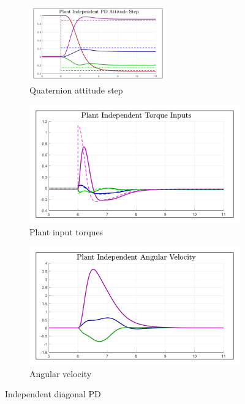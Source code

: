 \begin{figure}[htbp]
\centering
\begin{subfigure}{\textwidth}
\centering
\includegraphics[width=0.65\textwidth]{graphs/PD_Diagonal_Independent_Step}
\caption{Quaternion attitude step}
\label{fig:PD_Diagonal_Independent_Step}
\end{subfigure}
\begin{subfigure}{0.49\textwidth}
\centering
\includegraphics[width=\textwidth]{graphs/PD_Diagonal_Independent_Torque}
\caption{Plant input torques}
\label{fig:PD_Diagonal_Independent_Torque}
\end{subfigure}
\begin{subfigure}{0.49\textwidth}
\centering
\includegraphics[width=\textwidth]{graphs/PD_Diagonal_Independent_Angular}
\caption{Angular velocity}
\label{fig:PD_Diagonal_Independent_Angular}
\end{subfigure}
\caption{Independent diagonal PD}
\end{figure}
